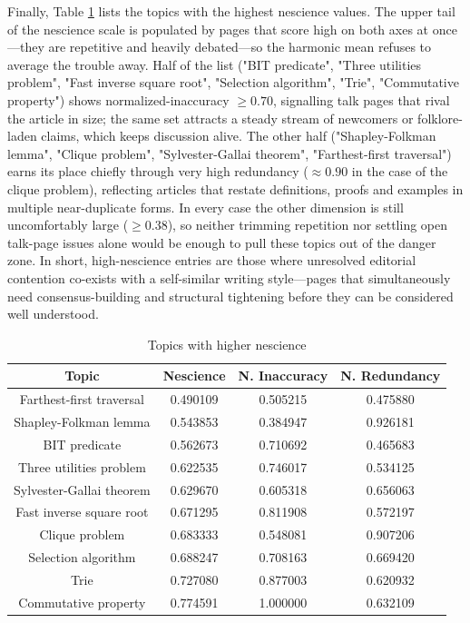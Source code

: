 Finally, Table \ref{tab:Higher-nescience-of-topics} lists the topics with the highest nescience values. The upper tail of the nescience scale is populated by pages that score high on both axes at once —they are repetitive and heavily debated—so the harmonic mean refuses to average the trouble away.  Half of the list ("BIT predicate", "Three utilities problem", "Fast inverse square root", "Selection algorithm", "Trie", "Commutative property") shows normalized-inaccuracy $\geq 0.70$, signalling talk pages that rival the article in size; the same set attracts a steady stream of newcomers or folklore-laden claims, which keeps discussion alive.  The other half ("Shapley-Folkman lemma", "Clique problem", "Sylvester-Gallai theorem", "Farthest-first traversal") earns its place chiefly through very high redundancy ($\approx 0.90$ in the case of the clique problem), reflecting articles that restate definitions, proofs and examples in multiple near-duplicate forms.  In every case the other dimension is still uncomfortably large ($\geq 0.38$), so neither trimming repetition nor settling open talk-page issues alone would be enough to pull these topics out of the danger zone.  In short, high-nescience entries are those where unresolved editorial contention co-exists with a self-similar writing style—pages that simultaneously need consensus-building and structural tightening before they can be considered well understood.

\begin{table}
\begin{centering}
\begin{tabular}{|c|c|c|c|}
\hline 
Topic & Nescience & N. Inaccuracy & N. Redundancy \tabularnewline
\hline 
\hline
Farthest-first traversal & 0.490109 & 0.505215 & 0.475880 \tabularnewline
\hline
Shapley-Folkman lemma & 0.543853 & 0.384947 & 0.926181 \tabularnewline
\hline
BIT predicate & 0.562673 & 0.710692 & 0.465683 \tabularnewline
\hline
Three utilities problem & 0.622535 & 0.746017 & 0.534125 \tabularnewline
\hline
Sylvester-Gallai theorem & 0.629670 & 0.605318 & 0.656063 \tabularnewline
\hline
Fast inverse square root & 0.671295 & 0.811908 & 0.572197 \tabularnewline
\hline
Clique problem & 0.683333 & 0.548081 & 0.907206 \tabularnewline
\hline
Selection algorithm & 0.688247 & 0.708163 & 0.669420 \tabularnewline
\hline
Trie & 0.727080 & 0.877003 & 0.620932 \tabularnewline
\hline
Commutative property & 0.774591 & 1.000000 & 0.632109 \tabularnewline
\hline 
\end{tabular}
\par\end{centering}
\caption{\label{tab:Higher-nescience-of-topics}Topics with higher nescience}
\end{table}

